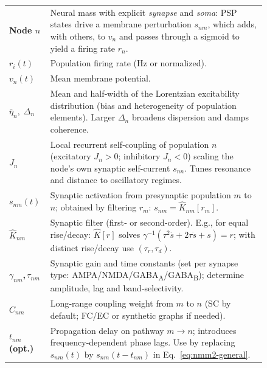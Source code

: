 \documentclass[12pt]{article}
\numberwithin{equation}{section}
\begin{document}
\begin{tcolorbox}[
  colback=gray!5,
  colframe=slate,
  colbacktitle=softblue!25,
  coltitle=softblue!60!black,
  fonttitle=\bfseries\small,
  title={
  \small \textit{NMM2  Network (Eq.~\ref{eq:nmm2-general})} \\ Whole-brain Simulations Parameters \& Physiological Meaning
  },
  boxrule=0.4pt, enhanced, sharp corners,
  left=4pt,right=4pt,top=3pt,bottom=3pt,
  boxsep=2pt, before skip=6pt, after skip=6pt
]
\scriptsize
\begin{tabular}{@{}l p{0.84\linewidth}@{}}
\textbf{Node $n$} & Neural mass with explicit \emph{synapse} and \emph{soma}: PSP states drive a membrane perturbation $s_{nm}$, which adds, with others, to $v_n$ and passes through a sigmoid to yield a firing rate $r_n$.\\
\textbf{$r_i(t)$}  & Population firing rate (Hz or normalized).  \\
\textbf{$v_n(t)$} & Mean membrane potential.  \\
\textbf{$\bar\eta_n,\;\Delta_n$} & Mean and half‑width of the Lorentzian excitability distribution (bias and heterogeneity of population elements). Larger $\Delta_n$ broadens dispersion and damps coherence.\\
\textbf{$J_n$} & Local recurrent self‑coupling of population $n$ (excitatory $J_n\!>\!0$; inhibitory $J_n\!<\!0$) scaling the node’s own synaptic self-current $s_{nn}$. Tunes resonance and distance to oscillatory regimes.\\
\textbf{$s_{nm}(t)$} & Synaptic activation from presynaptic population $m$ to $n$; obtained by filtering $r_m$: $s_{nm}=\hat K_{nm}[r_m]$.\\
\textbf{$\hat K_{nm}$} & Synaptic filter (first‑ or second‑order). E.g., for equal rise/decay: $\hat K[r]$ solves $\gamma^{-1}(\tau^2\ddot s+2\tau\dot s+s)=r$; with distinct rise/decay use $(\tau_r,\tau_d)$.\\
\textbf{$\gamma_{nm}$,\,$\tau_{nm}$} & Synaptic gain and time constants (set per synapse type: AMPA/NMDA/GABA\textsubscript{A}/GABA\textsubscript{B}); determine amplitude, lag and band‑selectivity.\\
\textbf{$C_{nm}$} & Long‑range coupling weight from $m$ to $n$ (SC by default; FC/EC or synthetic graphs if needed).\\
\textbf{$t_{nm}$ (opt.)} & Propagation delay on pathway $m{\to}n$; introduces frequency‑dependent phase lags. Use by replacing $s_{nm}(t)$ by $s_{nm}(t-t_{nm})$ in Eq.~\ref{eq:nmm2-general}.\\

\end{tabular}
\end{tcolorbox}
\end{document}
